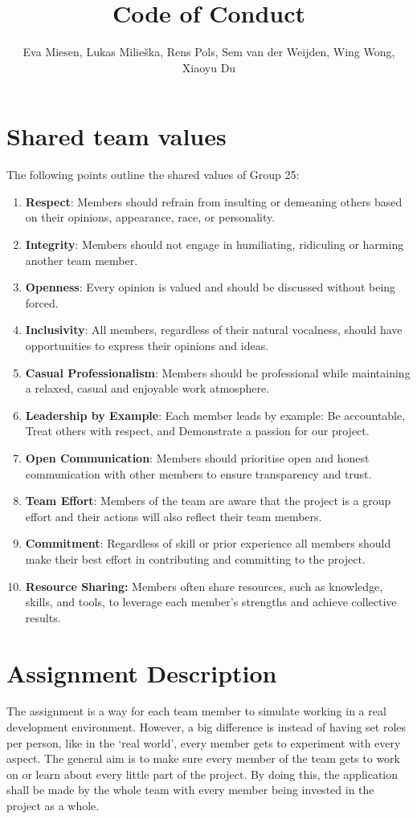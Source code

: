 \documentclass[sigconf,nonacm]{acmart}
\title{Code of Conduct}
\author{Eva Miesen, Lukas Milieška, Rens Pols, Sem van der Weijden, Wing Wong, Xiaoyu Du}
\begin{document}
\maketitle

\tableofcontents

\section{Shared team values}
The following points outline the shared values of Group 25:

\begin{enumerate}
    \item \textbf{Respect}: Members should refrain from insulting or demeaning others based on their opinions, appearance, race, or personality.
    \item \textbf{Integrity}: Members should not engage in humiliating, ridiculing or harming another team member.
    \item \textbf{Openness}: Every opinion is valued and should be discussed without being forced.
    \item \textbf{Inclusivity}: All members, regardless of their natural vocalness, should have opportunities to express their opinions and ideas.
    \item \textbf{Casual Professionalism}: Members should be professional while maintaining a relaxed, casual and enjoyable work atmosphere.
    \item \textbf{Leadership by Example}: Each member leads by example: Be accountable, Treat others with respect, and Demonstrate a passion for our project.
    \item \textbf{Open Communication}: Members should prioritise open and honest communication with other members to ensure transparency and trust.
    \item \textbf{Team Effort}: Members of the team are aware that the project is a group effort and their actions will also reflect their team members.
    \item \textbf{Commitment}: Regardless of skill or prior experience all members should make their best effort in contributing and committing to the project.
    \item \textbf{Resource Sharing:} Members often share resources, such as knowledge, skills, and tools, to leverage each member's strengths and achieve collective results.
\end{enumerate}

\section{Assignment Description}
The assignment is a way for each team member to simulate working in a real development environment. However, a big difference is instead of having set roles per person, like in the ‘real world’, every member gets to experiment with every aspect. The general aim is to make sure every member of the team gets to work on or learn about every little part of the project. By doing this, the application shall be made by the whole team with every member being invested in the project as a whole.
\end{document}

